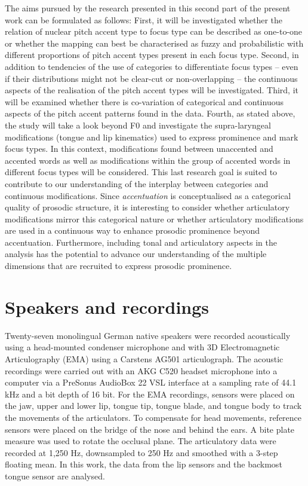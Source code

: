 The aims pursued by the research presented in this second part of the present work can be formulated as follows: First, it will be investigated whether the relation of nuclear pitch accent type to focus type can be described as one-to-one or whether the mapping can best be characterised as fuzzy and probabilistic with different proportions of pitch accent types present in each focus type. Second, in addition to tendencies of the use of categories to differentiate focus types -- even if their distributions might not be clear-cut or non-overlapping -- the continuous aspects of the realisation of the pitch accent types will be investigated. Third, it will be examined whether there is co-variation of categorical and continuous aspects of the pitch accent patterns found in the data. Fourth, as stated above, the study will take a look beyond F0 and investigate the supra-laryngeal modifications (tongue and lip kinematics) used to express prominence and mark focus types. In this context, modifications found between unaccented and accented words as well as modifications within the group of accented words in different focus types will be considered. This last research goal is suited to contribute to our understanding of the interplay between categories and continuous modifications. Since \emph{accentuation} is conceptualised as a categorical quality of prosodic structure, it is interesting to consider whether articulatory modifications mirror this categorical nature or whether articulatory modifications are used in a continuous way to enhance prosodic prominence beyond accentuation. Furthermore, including tonal and articulatory aspects in the analysis has the potential to advance our understanding of the multiple dimensions that are recruited to express prosodic prominence.

\section{Speakers and recordings}

Twenty-seven monolingual German native speakers were recorded acoustically using a head-mounted condenser microphone and with 3D Electromagnetic Articulography (EMA) using a Carstens AG501 articulograph. The acoustic recordings were carried out with an AKG C520 headset microphone into a computer via a PreSonus AudioBox 22 VSL interface at a sampling rate of 44.1 kHz and a bit depth of 16 bit. For the EMA recordings, sensors were placed on the jaw, upper and lower lip, tongue tip, tongue blade, and tongue body to track the movements of the articulators. To compensate for head movements, reference sensors were placed on the bridge of the nose and behind the ears. A bite plate measure was used to rotate the occlusal plane. The articulatory data were recorded at 1,250 Hz, downsampled to 250 Hz and smoothed with a 3-step floating mean. In this work, the data from the lip sensors and the backmost tongue sensor are analysed.


